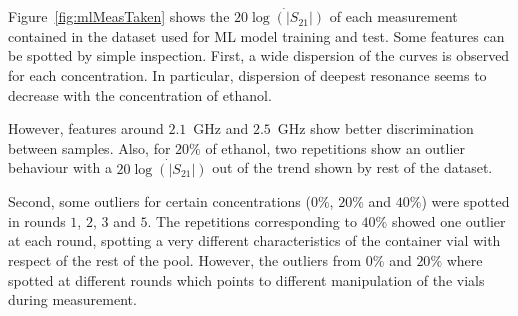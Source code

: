 \documentclass[journal,twoside,web]{ieeecolor}
\begin{document}
Figure~\ref{fig:mlMeasTaken} shows the $20\dot{\log\left(|S_{21}|\right)}$ of each measurement contained in the dataset used for ML model training and test. Some features can be spotted by simple inspection. First, a wide dispersion of the curves is observed for each concentration. In particular, dispersion of deepest resonance seems to decrease with the concentration of ethanol. 

However, features around $2.1$~GHz and $2.5$~GHz show better discrimination between samples. Also, for $20\%$ of ethanol, two repetitions show an outlier behaviour with a $20\dot{\log\left(|S_{21}|\right)}$ out of the trend shown by rest of the dataset.  

Second, some outliers for certain concentrations ($0\%$, $20\%$ and $40\%$) were spotted in rounds $1$, $2$, $3$ and $5$. The repetitions corresponding to $40\%$ showed one outlier at each round, spotting a very different characteristics of the container vial with respect of the rest of the pool. However, the outliers from $0\%$ and $20\%$ where spotted at different rounds which points to different manipulation of the vials during measurement.
\end{document}
